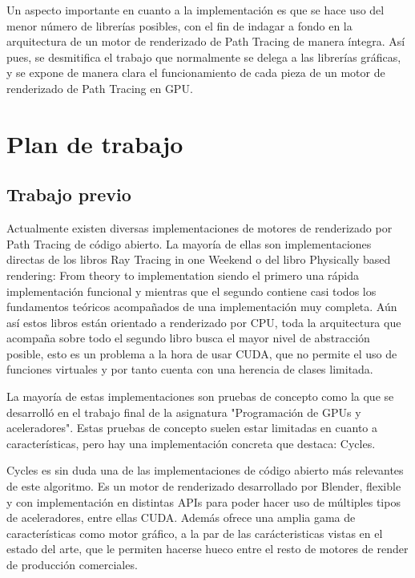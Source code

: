 Un aspecto importante en cuanto a la implementación es que se hace uso del menor número de librerías posibles, con el fin de indagar a fondo en la arquitectura de un motor de renderizado de Path Tracing de manera íntegra. Así pues, se desmitifica el trabajo que normalmente se delega a las librerías gráficas, y se expone de manera clara el funcionamiento de cada pieza de un motor de renderizado de Path Tracing en GPU.


\section{Plan de trabajo}
	
\subsection{Trabajo previo}

Actualmente existen diversas implementaciones de motores de renderizado por Path Tracing de código abierto. La mayoría de ellas son implementaciones directas de los libros Ray Tracing in one Weekend \cite{shirley2016ray} o del libro Physically based rendering: From theory to implementation \cite{pharr2016physically} siendo el primero una rápida implementación funcional y mientras que el segundo contiene casi todos los fundamentos teóricos acompañados de una implementación muy completa. Aún así estos libros están orientado a renderizado por CPU, toda la arquitectura que acompaña sobre todo el segundo libro busca el mayor nivel de abstracción posible, esto es un problema a la hora de usar CUDA, que no permite el uso de funciones virtuales y por tanto cuenta con una herencia de clases limitada.

La mayoría de estas implementaciones son pruebas de concepto como la que se desarrolló en el trabajo final de la asignatura "Programación de GPUs y aceleradores". Estas pruebas de concepto suelen estar limitadas en cuanto a características, pero hay una implementación concreta que destaca: Cycles.

Cycles es sin duda una de las implementaciones de código abierto más relevantes de este algoritmo. Es un motor de renderizado desarrollado por Blender, flexible y con implementación en distintas APIs para poder hacer uso de múltiples tipos de aceleradores, entre ellas CUDA. Además ofrece una amplia gama de características como motor gráfico, a la par de las carácteristicas vistas en el estado del arte, que le permiten hacerse hueco entre el resto de motores de render de producción comerciales.


